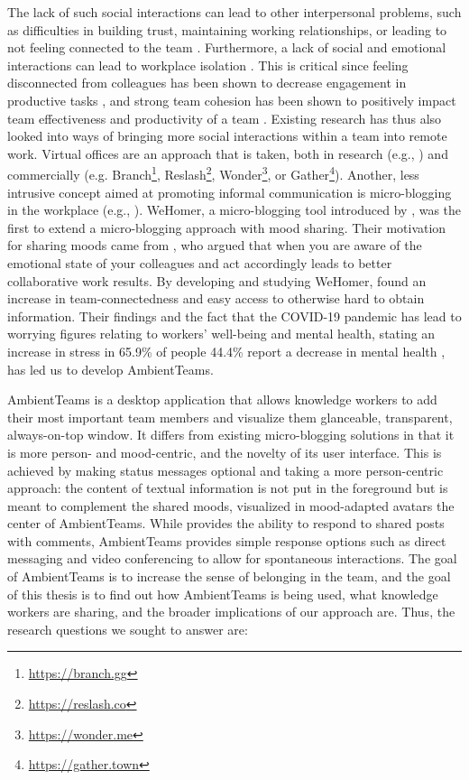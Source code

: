 The lack of such social interactions can lead to other interpersonal problems, such as difficulties in building trust, maintaining working relationships, or leading to not feeling connected to the team \autocite{comella2020revisiting, olson2006bridging}. Furthermore, a lack of social and emotional interactions can lead to workplace isolation \autocite{marshall2007workplace, gorlick2020productivity, mulki2009set}. This is critical since feeling disconnected from colleagues has been shown to decrease engagement in productive tasks \autocite{lostFocus2020}, and strong team cohesion has been shown to positively impact team effectiveness and productivity of a team \autocite{carlson2017virtual}. Existing research has thus also looked into ways of bringing more social interactions within a team into remote work. Virtual offices are an approach that is taken, both in research (e.g., \autocite{sasaki1999video, lou2012presencescape}) and commercially (e.g. Branch\footnote{\url{https://branch.gg}}, Reslash\footnote{\url{https://reslash.co}}, Wonder\footnote{\url{https://wonder.me}}, or Gather\footnote{\url{https://gather.town}}). Another, less intrusive concept aimed at promoting informal communication is micro-blogging in the workplace (e.g., \autocite{ebner2008microblogging, ehrlich2010microblogging, zhang2010case, dullemond2013fixing}). WeHomer, a micro-blogging tool introduced by \textcite{dullemond2013fixing}, was the first to extend a micro-blogging approach with mood sharing. Their motivation for sharing moods came from \textcite{garcia1999emotional}, who argued that when you are aware of the emotional state of your colleagues and act accordingly leads to better collaborative work results. By developing and studying WeHomer, \textcite{dullemond2013fixing} found an increase in team-connectedness and easy access to otherwise hard to obtain information. Their findings and the fact that the COVID-19 pandemic has lead to worrying figures relating to workers' well-being and mental health, stating an increase in stress in 65.9\% of people 44.4\% report a decrease in mental health \autocite{mswellbeing}, has led us to develop AmbientTeams.

AmbientTeams is a desktop application that allows knowledge workers to add their most important team members and visualize them glanceable, transparent, always-on-top window. It differs from existing micro-blogging solutions in that it is more person- and mood-centric, and the novelty of its user interface. This is achieved by making status messages optional and taking a more person-centric approach: the content of textual information is not put in the foreground but is meant to complement the shared moods, visualized in mood-adapted avatars the center of AmbientTeams. While \textcite{dullemond2013fixing} provides the ability to respond to shared posts with comments, AmbientTeams provides simple response options such as direct messaging and video conferencing to allow for spontaneous interactions. The goal of AmbientTeams is to increase the sense of belonging in the team, and the goal of this thesis is to find out how AmbientTeams is being used, what knowledge workers are sharing, and the broader implications of our approach are. Thus, the research questions we sought to answer are:

